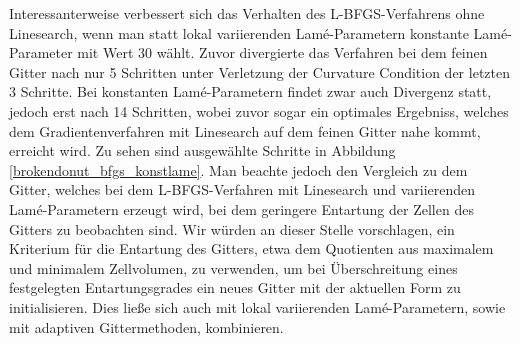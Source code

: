 Interessanterweise verbessert sich das Verhalten des L-BFGS-Verfahrens ohne Linesearch, wenn man statt lokal variierenden Lamé-Parametern konstante Lamé-Parameter mit Wert 30 wählt. Zuvor divergierte das Verfahren bei dem feinen Gitter nach nur 5 Schritten unter Verletzung der Curvature Condition der letzten 3 Schritte. Bei konstanten Lamé-Parametern findet zwar auch Divergenz statt, jedoch erst nach 14 Schritten, wobei zuvor sogar ein optimales Ergebniss, welches dem Gradientenverfahren mit Linesearch auf dem feinen Gitter nahe kommt, erreicht wird. Zu sehen sind ausgewählte Schritte in Abbildung \ref{brokendonut_bfgs_konstlame}. Man beachte jedoch den Vergleich zu dem Gitter, welches bei dem L-BFGS-Verfahren mit Linesearch und variierenden Lamé-Parametern erzeugt wird, bei dem geringere Entartung der Zellen des Gitters zu beobachten sind. Wir würden an dieser Stelle vorschlagen, ein Kriterium für die Entartung des Gitters, etwa dem Quotienten aus maximalem und minimalem Zellvolumen, zu verwenden, um bei Überschreitung eines festgelegten Entartungsgrades ein neues Gitter mit der aktuellen Form zu initialisieren. Dies ließe sich auch mit lokal variierenden Lamé-Parametern, sowie mit adaptiven Gittermethoden, kombinieren.

